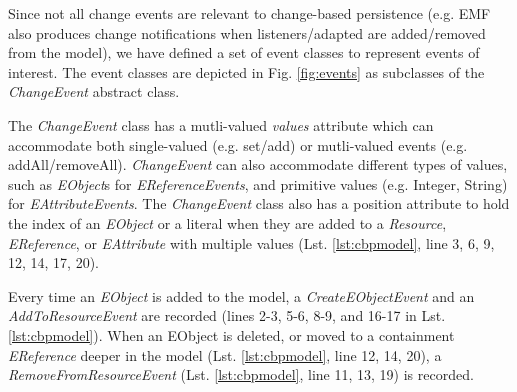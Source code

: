 \documentclass{llncs}
\begin{document}
Since not all change events are relevant to change-based persistence (e.g. EMF also produces change notifications when listeners/adapted are added/removed from the model), we have defined a set of event classes to represent events of interest. The event classes are depicted in Fig. \ref{fig:events} as subclasses of the \emph{ChangeEvent} abstract class.  %

The \emph{ChangeEvent} class has a mutli-valued \emph{values} attribute which can accommodate both single-valued (e.g. set/add) or mutli-valued events (e.g. addAll/removeAll). \emph{ChangeEvent} can also accommodate different types of values, such as \emph{EObject}s for \emph{EReferenceEvents}, and primitive values (e.g. Integer, String) for \emph{EAttributeEvents}. The \emph{ChangeEvent} class also has a position attribute to hold the  index of an \emph{EObject} or a literal when they are added to a \emph{Resource}, \emph{EReference}, or \emph{EAttribute} with multiple values (Lst. \ref{lst:cbpmodel}, line 3, 6, 9, 12, 14, 17, 20). 



Every time an \emph{EObject} is added to the model, a \emph{CreateEObjectEvent} and an \emph{AddToResourceEvent} are recorded (lines 2-3, 5-6, 8-9, and 16-17 in Lst. \ref{lst:cbpmodel}). When an EObject is deleted, or moved to a containment \emph{EReference} deeper in the model (Lst. \ref{lst:cbpmodel}, line 12, 14, 20), a \emph{RemoveFromResourceEvent} (Lst. \ref{lst:cbpmodel}, line 11, 13, 19) is recorded.
\end{document}
